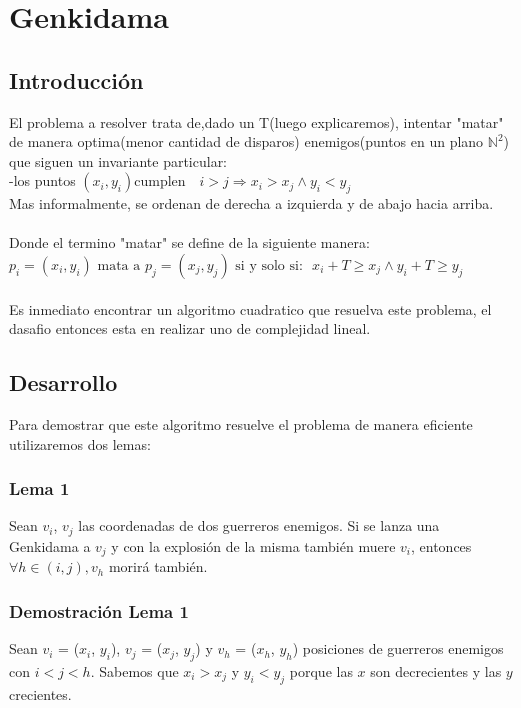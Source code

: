 \section{Genkidama}

	\subsection{Introducción}
    El problema a resolver trata de,dado un T(luego explicaremos), intentar "matar"  de manera optima(menor cantidad de disparos) enemigos(puntos en un plano $\mathbb{N}^{2}$) que siguen un invariante particular:\\
-los puntos  $(x_i,y_i)\textrm{cumplen} \quad i>j \Rightarrow x_i > x_j \wedge y_i < y_j$\\
Mas informalmente, se ordenan de derecha a izquierda y de abajo hacia arriba.
\\
\\
Donde el termino "matar" se define de la siguiente manera:
$p_i=(x_i,y_i) \textrm{ mata a } p_j=(x_j,y_j) \textrm{ si y solo si: }$
$x_i+T \geq x_j \wedge y_i+T \geq y_j$
\\
\\
Es inmediato encontrar un algoritmo cuadratico que resuelva este problema, el dasafio entonces esta en realizar uno de complejidad lineal.
    \subsection{Desarrollo}
    	
    	Para demostrar que este algoritmo resuelve el problema de manera eficiente utilizaremos dos lemas:
    		\subsubsection*{Lema 1}

    			Sean $v_{i}$, $v_{j}$ las coordenadas de dos guerreros enemigos. Si se lanza una Genkidama a $v_{j}$ y con la explosión de la misma también muere $v_{i}$, entonces $ \forall h \in (i,j), v_{h}$ morirá también. 

    		\subsubsection*{Demostración Lema 1}

    			Sean $v_{i}$ = ($x_{i}$, $y_{i}$), $v_{j}$ = ($x_{j}$, $y_{j}$) y $v_{h}$ = ($x_{h}$, $y_{h}$) posiciones de guerreros enemigos con $i < j < h$.
    			Sabemos que $x_{i} > x_{j}$ y $y_{i} < y_{j}$ porque las $x$ son decrecientes y las $y$ crecientes.

